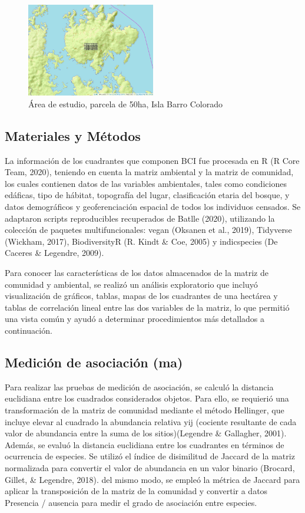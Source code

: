 \documentclass[11pt,]{article}
\begin{document}
\begin{figure}
\centering
\includegraphics[width=0.50000\textwidth]{Mapa .png}
\caption{Área de estudio, parcela de 50ha, Isla Barro Colorado
\label{fig:Mapa}}
\end{figure}

\subsection{Materiales y Métodos}\label{materiales-y-muxe9todos}

La información de los cuadrantes que componen BCI fue procesada en R (R
Core Team, 2020), teniendo en cuenta la matriz ambiental y la matriz de
comunidad, los cuales contienen datos de las variables ambientales,
tales como condiciones edáficas, tipo de hábitat, topografía del lugar,
clasificación etaria del bosque, y datos demográficos y geoferenciación
espacial de todos los individuos censados. Se adaptaron scripts
reproducibles recuperados de Batlle (2020), utilizando la colección de
paquetes multifuncionales: vegan (Oksanen et al., 2019), Tidyverse
(Wickham, 2017), BiodiversityR (R. Kindt \& Coe, 2005) y indicspecies
(De Caceres \& Legendre, 2009).

Para conocer las características de los datos almacenados de la matriz
de comunidad y ambiental, se realizó un análisis exploratorio que
incluyó visualización de gráficos, tablas, mapas de los cuadrantes de
una hectárea y tablas de correlación lineal entre las dos variables de
la matriz, lo que permitió una vista común y ayudó a determinar
procedimientos más detallados a continuación.

\subsection{Medición de asociación
(ma)}\label{mediciuxf3n-de-asociaciuxf3n-ma}

Para realizar las pruebas de medición de asociación, se calculó la
distancia euclidiana entre los cuadrados considerados objetos. Para
ello, se requierió una transformación de la matriz de comunidad mediante
el método Hellinger, que incluye elevar al cuadrado la abundancia
relativa yij (cociente resultante de cada valor de abundancia entre la
suma de los sitios)(Legendre \& Gallagher, 2001). Además, se evaluó la
distancia euclidiana entre los cuadrantes en términos de ocurrencia de
especies. Se utilizó el índice de disimilitud de Jaccard de la matriz
normalizada para convertir el valor de abundancia en un valor binario
(Brocard, Gillet, \& Legendre, 2018). del mismo modo, se empleó la
métrica de Jaccard para aplicar la transposición de la matriz de la
comunidad y convertir a datos Presencia / ausencia para medir el grado
de asociación entre especies.
\end{document}
